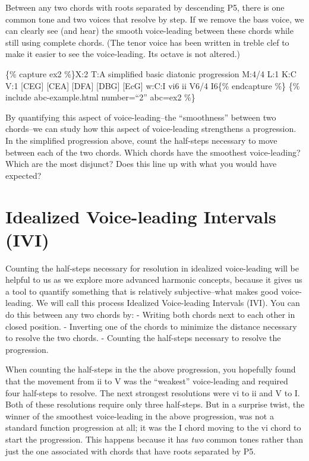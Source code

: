 \documentclass{book}
\begin{document}
Between any two chords with roots separated by descending P5, there is one
common tone and two voices that resolve by step. If we remove the bass voice,
we can clearly see (and hear) the smooth voice-leading between these chords
while still using complete chords. (The tenor voice has been written in treble
clef to make it easier to see the voice-leading. Its octave is not altered.)

\{\% capture ex2 \%\}X:2 T:A simplified basic diatonic progression M:4/4 L:1
K:C V:1 {[}CEG{]}\textbar{} {[}CEA{]}\textbar{} {[}DFA{]}\textbar{}
{[}DBG{]}\textbar{} {[}EcG{]}\textbar{]} w:C:I vi6 ii V6/4 I6\{\% endcapture
\%\} \{\% include abc-example.html number=``2'' abc=ex2 \%\}

By quantifying this aspect of voice-leading--the ``smoothness'' between two
chords--we can study how this aspect of voice-leading strengthens a
progression. In the simplified progression above, count the half-steps
necessary to move between each of the two chords. Which chords have the
smoothest voice-leading? Which are the most disjunct? Does this line up with
what you would have expected?

\hypertarget{idealized-voice-leading-intervals-ivi}{%
\section{Idealized Voice-leading Intervals
(IVI)}\label{idealized-voice-leading-intervals-ivi}}

Counting the half-steps necessary for resolution in idealized voice-leading
will be helpful to us as we explore more advanced harmonic concepts, because
it gives us a tool to quantify something that is relatively subjective--what
makes good voice-leading. We will call this process Idealized Voice-leading
Intervals (IVI). You can do this between any two chords by: - Writing both
chords next to each other in closed position. - Inverting one of the chords to
minimize the distance necessary to resolve the two chords. - Counting the
half-steps necessary to resolve the progression.

When counting the half-steps in the the above progression, you hopefully found
that the movement from ii to V was the ``weakest'' voice-leading and required
four half-steps to resolve. The next strongest resolutions were vi to ii and V
to I. Both of these resolutions require only three half-steps. But in a
surprise twist, the winner of the smoothest voice-leading in the above
progression, was not a standard function progression at all; it was the I
chord moving to the vi chord to start the progression. This happens because it
has \emph{two} common tones rather than just the one associated with chords
that have roots separated by P5.
\end{document}
